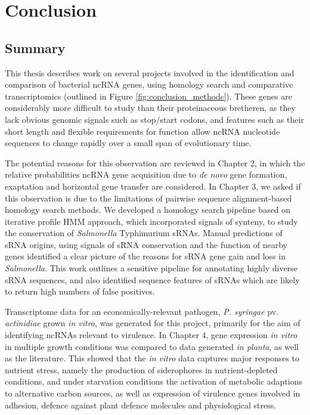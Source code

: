 \chapter{Conclusion}
\label{chap:conclusion}

\section{Summary}

This thesis describes work on several projects involved in the identification and comparison of bacterial ncRNA genes, using homology search and comparative transcriptomics (outlined in Figure \ref{fig:conclusion_methods}). These genes are considerably more difficult to study than their proteinaceous bretheren, as they lack obvious genomic signals such as stop/start codons, and features such as their short length and flexible requirements for function allow ncRNA nucleotide sequences to change rapidly over a small span of evolutionary time. 

The potential reasons for this observation are reviewed in Chapter 2, in which the relative probabilities ncRNA gene acquisition due to \textit{de novo} gene formation, exaptation and horizontal gene transfer are considered. In Chapter 3, we asked if this observation is due to the limitations of pairwise sequence alignment-based homology search methods. We developed a homology search pipeline based on iterative profile HMM approach, which incorporated signals of synteny, to study the conservation of \textit{Salmonella} Typhimurium sRNAs. Manual predictions of sRNA origins, using signals of sRNA conservation and the function of nearby genes   identified a clear picture of the reasons for sRNA gene gain and loss in \textit{Salmonella}. This work outlines a sensitive pipeline for annotating highly diverse sRNA sequences, and also identified sequence features of sRNAs which are likely to return high numbers of false positives. 

Transcriptome data for an economically-relevant pathogen, \textit{P. syringae} pv. \textit{actinidiae} grown \textit{in vitro}, was generated for this project, primarily for the aim of identifying ncRNAs relevant to virulence. In Chapter 4, gene expression \textit{in vitro} in multiple growth conditions was compared to data generated \textit{in planta}, as well as the literature. This showed that the \textit{in vitro} data captures major responses to nutrient stress, namely the production of siderophores in nutrient-depleted conditions, and under starvation conditions the activation of metabolic adaptions to alternative carbon sources, as well as expression of virulence genes involved in adhesion, defence against plant defence molecules and physiological stress.


